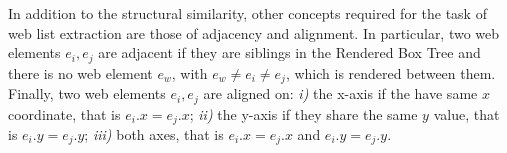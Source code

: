 \begin{figure}
 \center
{} 
\caption{}
\label{fig:NormalizedEditDistance}
\end{figure}
In addition to the structural similarity, other concepts required for the task of web list extraction are those of adjacency and alignment. 
In particular, two web elements $e_i, e_j$ are adjacent if they are siblings in the Rendered Box Tree and there is no  web element $e_w$, with $e_w \neq e_i \neq e_j$, which is rendered between them. Finally, two web elements $e_i, e_j$ are aligned on: \emph{i)} the x-axis if the have same $x$ coordinate, that is $e_i.x = e_j.x$; \emph{ii)} the y-axis if they share the same $y$ value, that is $e_i.y = e_j.y$; \emph{iii)}  both axes, that is $e_i.x = e_j.x$ and $e_i.y = e_j.y$.

